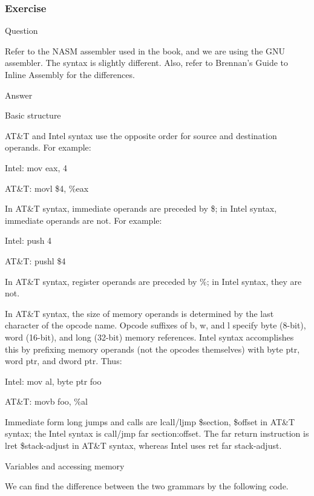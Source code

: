 \subsubsection{Exercise }
\begin{flushleft}
{\Large Question}
\end{flushleft}

Refer to the NASM assembler used in the book, and we are using the GNU assembler. The syntax is slightly different.
Also, refer to Brennan's Guide to Inline Assembly for the differences.

\begin{flushleft}
{\Large Answer}
\medskip

{\large Basic structure}

AT\&T and Intel syntax use the opposite order for source and destination operands. For example:

\quad Intel: mov eax, 4

\quad AT\&T: movl \$4, \%eax

In AT\&T syntax, immediate operands are preceded by \$; in Intel syntax, immediate operands are not. For example:

\quad Intel: push 4

\quad AT\&T: pushl \$4

In AT\&T syntax, register operands are preceded by \%; in Intel syntax, they are not.

In AT\&T syntax, the size of memory operands is determined by the last character of the opcode name. Opcode suffixes of b, w, and l specify byte (8-bit), word (16-bit), and long (32-bit) memory references. Intel syntax accomplishes this by prefixing memory operands (not the opcodes themselves) with byte ptr, word ptr, and dword ptr. Thus:

\quad Intel: mov al, byte ptr foo

\quad AT\&T: movb foo, \%al

Immediate form long jumps and calls are lcall/ljmp \$section, \$offset in AT\&T syntax; the Intel syntax is call/jmp far section:offset. The far return instruction is lret \$stack-adjust in AT\&T syntax, whereas Intel uses ret far stack-adjust.

\medskip
{\large Variables and accessing memory}

We can find the difference between the two grammars by the following code.


\end{flushleft}
